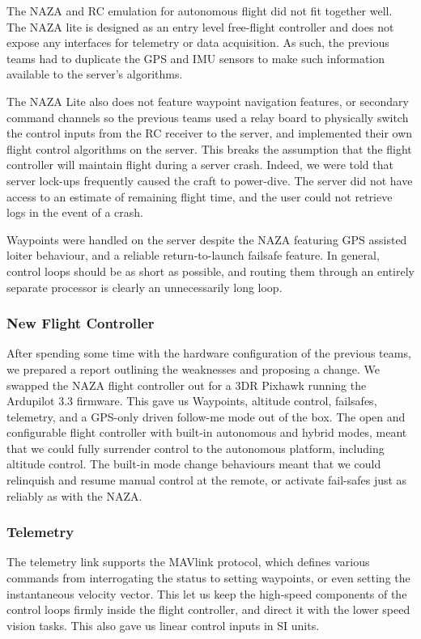 \documentclass{article}
\begin{document}
      The NAZA and RC emulation for autonomous flight did not fit together well. The NAZA lite is designed as an entry level free-flight controller and does not expose any interfaces for telemetry or data acquisition.  As such, the previous teams had to duplicate the GPS and IMU sensors to make such information available to the server's algorithms.

      The NAZA Lite also does not feature waypoint navigation features, or secondary command channels so the previous teams used a relay board to physically switch the control inputs from the RC receiver to the server, and implemented their own flight control algorithms on the server.
      This breaks the assumption that the flight controller will maintain flight during a server crash.  Indeed, we were told that server lock-ups frequently caused the craft to power-dive.
      The server did not have access to an estimate of remaining flight time, and the user could not retrieve logs in the event of a crash.

      Waypoints were handled on the server despite the NAZA featuring GPS assisted loiter behaviour, and a reliable return-to-launch failsafe feature.  In general, control loops should be as short as possible, and routing them through an entirely separate processor is clearly an unnecessarily long loop.

    \subsubsection{New Flight Controller}
      After spending some time with the hardware configuration of the previous teams, we prepared a report outlining the weaknesses and proposing a change.
      We swapped the NAZA flight controller out for a 3DR Pixhawk running the Ardupilot 3.3 firmware.  This gave us Waypoints, altitude control, failsafes, telemetry, and a GPS-only driven follow-me mode out of the box.
      The open and configurable flight controller with built-in autonomous and hybrid modes, meant that we could fully surrender control to the autonomous platform, including altitude control.  The built-in mode change behaviours meant that we could relinquish and resume manual control at the remote, or activate fail-safes just as reliably as with the NAZA.
      
    \subsubsection{Telemetry}
      The telemetry link supports the MAVlink protocol, which defines various commands from interrogating the status to setting waypoints, or even setting the instantaneous velocity vector.
      This let us keep the high-speed components of the control loops firmly inside the flight controller, and direct it with the lower speed vision tasks.  This also gave us linear control inputs in SI units.
\end{document}
